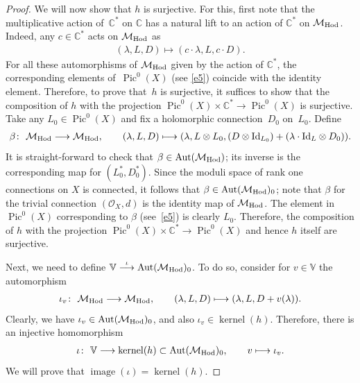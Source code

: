 \documentclass[pdftex]{sigma}
\numberwithin{equation}{section}
\begin{document}
\begin{proof}
We will now show that $h$ is surjective. For this, f\/irst note that the multiplicative action of~${\mathbb C}^*$ on $\mathbb C$ has a natural lift to an action of ${\mathbb C}^*$ on ${\mathcal M}_{\rm Hod}$. Indeed, any $c \in {\mathbb C}^*$ acts on ${\mathcal M}_{\rm Hod}$ as
\begin{gather*}
(\lambda, L, D) \longmapsto (c\cdot\lambda, L, c\cdot D) .
\end{gather*}
For all these automorphisms of ${\mathcal M}_{\rm Hod}$ given by the action of ${\mathbb C}^*$, the corresponding elements of~$\operatorname{Pic}^0(X)$ (see \eqref{e5}) coincide with the identity element. Therefore, to prove that~$h$ is surjective, it suf\/f\/ices to show that the composition of $h$ with the projection $\operatorname{Pic}^0(X)\times {\mathbb C}^*  \longrightarrow \operatorname{Pic}^0(X)$ is surjective. Take any $L_0 \in \operatorname{Pic}^0(X)$ and f\/ix a holomorphic connection~$D_0$ on~$L_0$. Def\/ine
\begin{gather*}
\beta \colon \  {\mathcal M}_{\rm Hod} \longrightarrow {\mathcal M}_{\rm Hod} ,\qquad
(\lambda, L, D) \longmapsto (\lambda, L\otimes L_0, (D\otimes \text{Id}_{L_0}) +(\lambda\cdot \text{Id}_L\otimes D_0)) .
\end{gather*}
It is straight-forward to check that $\beta \in \operatorname{Aut}({\mathcal M}_{\rm Hod})$; its inverse is the corresponding map for $(L_0^*, D_0^*)$. Since the moduli space of rank one connections on $X$ is connected, it follows that $\beta \in \operatorname{Aut}({\mathcal M}_{\rm Hod})_0$; note that $\beta$ for the trivial connection $({\mathcal O}_X, d)$ is the identity map of ${\mathcal M}_{\rm Hod}$. The element in $\operatorname{Pic}^0(X)$ corresponding to $\beta$ (see~\eqref{e5}) is clearly $L_0$. Therefore, the composition of $h$ with the projection $\operatorname{Pic}^0(X)\times {\mathbb C}^*  \longrightarrow \operatorname{Pic}^0(X)$ and hence $h$ itself are surjective.

Next, we need to def\/ine ${\mathbb V} \stackrel{\iota}{\longrightarrow} \operatorname{Aut}({\mathcal M}_{\rm Hod})_0$. To do so, consider for $v \in \mathbb V$ the automorphism
\begin{gather}\label{e6}
\iota_v \colon \ {\mathcal M}_{\rm Hod} \longrightarrow {\mathcal M}_{\rm Hod} ,\qquad (\lambda, L, D) \longmapsto (\lambda, L, D+v(\lambda)) .
\end{gather}
Clearly, we have $\iota_v \in \operatorname{Aut}({\mathcal M}_{\rm Hod})_0$, and also $\iota_v \in \operatorname{kernel}(h)$. Therefore, there is an injective homomorphism
\begin{gather*}
\iota \colon \ {\mathbb V} \longrightarrow \operatorname{kernel}(h) \subset \operatorname{Aut}({\mathcal M}_{\rm Hod})_0 ,\qquad v \longmapsto \iota_v .
\end{gather*}
We will prove that $\operatorname{image}(\iota) = \operatorname{kernel}(h)$.


\end{proof}
\end{document}
